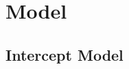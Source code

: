 \documentclass[conference]{IEEEtran}
\providecommand{\DIFdelbegin}{} %
\newcommand{\DIFscaledelfig}{0.5}
\newlength{\DIFdelgraphicswidth} %
\newlength{\DIFdelgraphicsheight} %
\newcommand{\DIFdelincludegraphics}[2][]{%
\sbox{\DIFdelgraphicsbox}{\DIFOincludegraphics[#1]{#2}}%
\settoboxwidth{\DIFdelgraphicswidth}{\DIFdelgraphicsbox} %
\settoboxtotalheight{\DIFdelgraphicsheight}{\DIFdelgraphicsbox} %
\scalebox{\DIFscaledelfig}{%
\parbox[b]{\DIFdelgraphicswidth}{\usebox{\DIFdelgraphicsbox}\\[-\baselineskip] \rule{\DIFdelgraphicswidth}{0em}}\llap{\resizebox{\DIFdelgraphicswidth}{\DIFdelgraphicsheight}{%
\setlength{\unitlength}{\DIFdelgraphicswidth}%
\begin{picture}(1,1)%
\thicklines\linethickness{2pt} %
{\color[rgb]{1,0,0}\put(0,0){\framebox(1,1){}}}%
{\color[rgb]{1,0,0}\put(0,0){\line( 1,1){1}}}%
{\color[rgb]{1,0,0}\put(0,1){\line(1,-1){1}}}%
\end{picture}%
}\hspace*{3pt}}} %
} %
\DeclareRobustCommand{\DIFdelbegin}{\DIFOdelbegin \let\includegraphics\DIFdelincludegraphics} %
\begin{document}
\section{Model}





\subsection{Intercept Model}
\DIFdelbegin %
\end{document}
